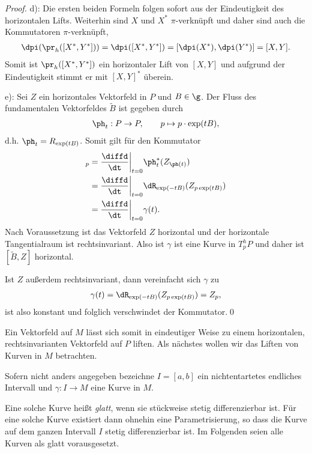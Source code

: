 \documentclass[%
	paper=a5,%
	fleqn,%
	DIV=18,%
	BCOR=0mm,
	fontsize=11pt,
	titlepage=false,%
	bibliography=totoc,
	DIV=18,%
	twoside=true,
	pdftitle=Riemannsche Geometrie,
	pdfauthor=Uwe Semmelmann,
	numbers=noendperiod]%
	{scrbook}
\begin{document}
\begin{proof}
d): Die ersten beiden Formeln folgen sofort aus der Eindeutigkeit des
horizontalen Lifts. Weiterhin sind $X$ und $X^*$ $\pi$-verknüpft und daher sind
auch die Kommutatoren $\pi$-verknüpft,
\begin{align*}
\dpi(\pr_h([X^*,Y^*])) = 
\dpi([X^*,Y^*]) = 
[\dpi(X^*),\dpi(Y^*)] = [X,Y].
\end{align*}
Somit ist $\pr_h([X^*,Y^*])$ ein horizontaler Lift von $[X,Y]$ und aufgrund der
Eindeutigkeit stimmt er mit $[X,Y]^*$ überein.

e): Sei $Z$ ein horizontales Vektorfeld in $P$ und $B\in\g$. Der Fluss des
fundamentalen Vektorfeldes $\tilde{B}$ ist gegeben durch
\begin{align*}
\ph_t : P\to P,\qquad p\mapsto p\cdot \exp(tB), 
\end{align*}
d.h. $\ph_t = R_{\exp(tB)}$. Somit gilt für den Kommutator
\begin{align*}
[\tilde{B},Z]_p  &= \frac{\diffd}{\dt}\bigg|_{t=0} \ph_t^*(Z_{\ph(t)})\\
&= \frac{\diffd}{\dt}\bigg|_{t=0} \dR_{\exp(-tB)}(Z_{p\exp(tB)})\\
&= \frac{\diffd}{\dt}\bigg|_{t=0} \gamma(t).
\end{align*}
Nach Voraussetzung ist das Vektorfeld $Z$ horizontal und der horizontale Tangentialraum ist
rechtsinvariant. Also ist $\gamma$ ist eine Kurve in $T^h_pP$ und daher ist
$[\tilde{B},Z]$ horizontal.

Ist $Z$ außerdem rechts\-invariant, dann vereinfacht sich $\gamma$ zu
\begin{align*}
\gamma(t) = \dR_{\exp(-tB)}(Z_{p\exp(tB)}) = Z_p,
\end{align*}
ist also konstant und folglich verschwindet der Kommutator.\qed
\end{proof}

Ein Vektorfeld auf $M$ lässt sich somit in eindeutiger Weise zu einem
horizontalen, rechtsinvarianten Vektorfeld auf $P$ liften. Als nächstes wollen
wir das Liften von Kurven in $M$ betrachten. 


\begin{rem}
Sofern nicht anders angegeben bezeichne $I=[a,b]$ ein nichtentartetes endliches
Intervall und $\gamma: I\to M$ eine Kurve in $M$.

Eine solche Kurve heißt \textit{glatt}, wenn sie stückweise stetig
differenzierbar ist. Für eine solche Kurve existiert dann ohnehin eine
Parametrisierung, so dass die Kurve auf dem ganzen Intervall $I$ stetig
differenzierbar ist. Im Folgenden seien alle Kurven als glatt vorausgesetzt.
\map
\end{rem}
\end{document}
